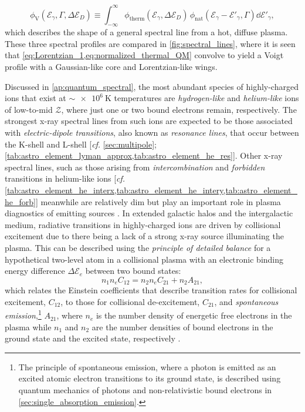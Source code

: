 \begin{equation}\label{eq:voigt}
 \phi_{\text{V}} \left( \mathcal{E}_{\gamma}, \Gamma, \Delta \mathcal{E}_D \right) \equiv \int_{-\infty}^{\infty} \phi_{\text{therm}} \left( \mathcal{E}_{\gamma} , \Delta \mathcal{E}_D \right) \, \phi_{\text{nat}} \left( \mathcal{E}_{\gamma} - \mathcal{E}'_{\gamma} , \Gamma \right) \dd{\mathcal{E}'_{\gamma}},
 \end{equation}
which describes the shape of a general spectral line from a hot, diffuse plasma. %
These three spectral profiles are compared in \cref{fig:spectral_lines}, where it is seen that \cref{eq:Lorentzian_1,eq:normalized_thermal_QM} convolve to yield a Voigt profile with a Gaussian-like core and Lorentzian-like wings. 

Discussed in \cref{ap:quantum_spectral}, the most abundant species of highly-charged ions that exist at $\sim \SI{e6}{\kelvin}$ temperatures are \emph{hydrogen-like} and \emph{helium-like} ions of low-to-mid $\mathcal{Z}$, where just one or two bound electrons remain, respectively. 
The strongest x-ray spectral lines from such ions are expected to be those associated with \emph{electric-dipole transitions}, also known as \emph{resonance lines}, that occur between the K-shell and L-shell [\emph{cf.\@} \cref{sec:multipole}; \cref{tab:astro_element_lyman_approx,tab:astro_element_he_res}]. 
Other x-ray spectral lines, such as those arising from \emph{intercombination} and \emph{forbidden} transitions in helium-like ions [\emph{cf.\@} \cref{tab:astro_element_he_interx,tab:astro_element_he_intery,tab:astro_element_he_forb}] meanwhile are relatively dim but play an important role in plasma diagnostics of emitting sources \cite{Porquet2010,Paerels03,Kahn02}. 
In extended galactic halos and the intergalactic medium, radiative transitions in highly-charged ions are driven by collisional excitement due to there being a lack of a strong x-ray source illuminating the plasma. 
This can be described using the \emph{principle of detailed balance} for a hypothetical two-level atom in a collisional plasma with an electronic binding energy difference $\Delta \mathcal{E}_e$ between two bound states:
\begin{equation}
 n_1 n_e C_{12} = n_2 n_e C_{21} + n_2 A_{21} ,
 \end{equation}
which relates the Einstein coefficients that describe transition rates for collisional excitement, $C_{12}$, to those for collisional de-excitement, $C_{21}$, and \emph{spontaneous emission},\footnote{The principle of spontaneous emission, where a photon is emitted as an excited atomic electron transitions to its ground state, is described using quantum mechanics of photons and non-relativistic bound electrons in \cref{sec:single_absorption_emission}.} $A_{21}$, where $n_e$ is the number density of energetic free electrons in the plasma while $n_1$ and $n_2$ are the number densities of bound electrons in the ground state and the excited state, respectively \cite{Mo10}. 

